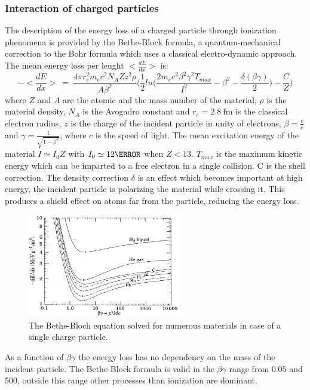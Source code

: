 \subsubsection{Interaction of charged particles}
The description of the energy loss of a charged particle through ionization phenomena is provided by the Bethe-Block formula\cite{bethe_block}, a quantum-mechanical correction to the Bohr formula which uses a classical electro-dynamic approach.
The mean energy loss per lenght $<\frac{dE}{dx}>$ is:
\begin{equation}
-<\frac{dE}{dx}>~=~\frac{4\pi r^2_e m_ec^2 N_A Zz^2 \rho}{A\beta^2}\bigg( \frac{1}{2} ln\bigg( \frac{2m_e c^2 \beta^2 \gamma^2 T_{max}}{I^2}-\beta^2 -\frac{\delta(\beta \gamma)}{2} \bigg) - \frac{C}{Z}  \bigg)
\end{equation}
where $Z$ and $A$ are the atomic and the mass number of the material, $\rho$ is the material density, $N_A$ is the Avogadro constant and $r_e=\SI{2.8}{\femto\meter}$ is the classical electron radius, $z$ is the charge of the incident particle in unity of electrons, $\beta = \frac{v}{c}$ and $\gamma = \frac{1}{\sqrt{1-\beta^2}}$, where $c$ is the speed of light. The mean excitation energy of the material $I\simeq I_0Z$ with $I_0 \simeq 12 \eV$ when $Z<13$. $T_{max}$ is the maximum kinetic energy which can be imparted to a free electron in a single collision. C is the shell correction.
The density correction $\delta$ is an effect which becomes important at high energy, the incident particle is polarizing the material while crossing it. This produces a shield effect on atoms far from the particle, reducing the energy loss.
\begin{figure}
\center
\includegraphics[width=0.6\textwidth]{./Images/tracking_det/BetheBlock.png}
\caption{The Bethe-Bloch equation solved for numerous materials in case of a single charge particle.}
\label{pic:bethe}
\end{figure}
As a function of $\beta \gamma$ the energy loss has no dependency on the mass of the incident particle. The Bethe-Block formula is valid in the $\beta \gamma$ range from 0.05 and 500, outside this range other processes than ionization are dominant.\\

